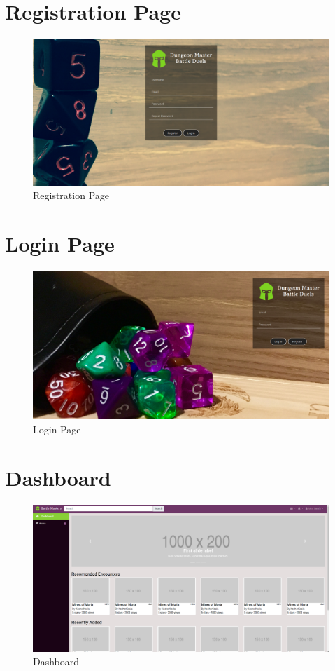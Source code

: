 \documentclass[12pt,a4paper]{report}
\begin{document}
	\section{Registration Page}
	\begin{figure}[H]
		\centering
		\includegraphics[scale=.20]{register}
		\caption{Registration Page}
		\label{fig: Registration Page}
	\end{figure}
	\section{Login Page}
	\begin{figure}[H]
		\centering
		\includegraphics[scale=.20]{login}
		\caption{Login Page}
		\label{fig: Login Page}
	\end{figure}
	\section{Dashboard}
	\begin{figure}[H]
		\centering
		\includegraphics[scale=.20]{home}
		\caption{Dashboard}
		\label{fig: Dashboard}
	\end{figure}
\end{document}
